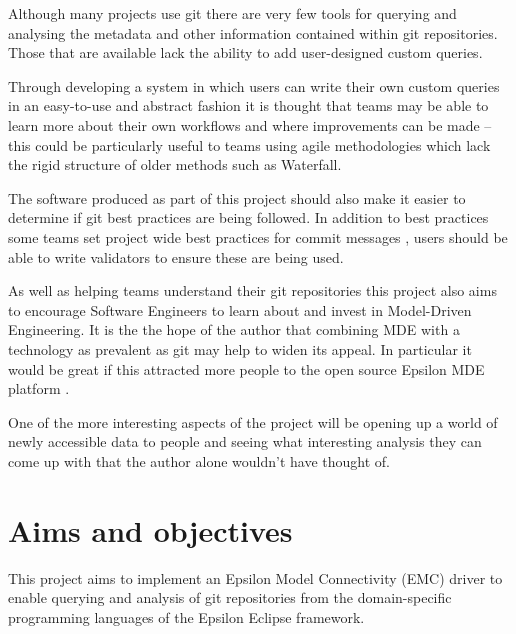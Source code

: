 \documentclass[11pt]{book}
\begin{document}
Although many projects use git there are very few tools for querying and analysing the metadata and other information contained within git repositories. Those that are available lack the ability to add user-designed custom queries. 

Through developing a system in which users can write their own custom queries in an easy-to-use and abstract fashion it is thought that teams may be able to learn more about their own workflows and where improvements can be made -- this could be particularly useful to teams using agile methodologies which lack the rigid structure of older methods such as Waterfall.

The software produced as part of this project should also make it easier to determine if git best practices \cite{gitbestpractices} are being followed. In addition to best practices some teams set project wide best practices for commit messages \cite{erlanggitcommitmessages}, users should be able to write validators to ensure these are being used.

As well as helping teams understand their git repositories this project also aims to encourage Software Engineers to learn about and invest in Model-Driven Engineering. It is the the hope of the author that combining MDE with a technology as prevalent as git may help to widen its appeal. In particular it would be great if this attracted more people to the open source Epsilon MDE platform \cite{epsilonhomepage}.

One of the more interesting aspects of the project will be opening up a world of newly accessible data to people and seeing what interesting analysis they can come up with that the author alone wouldn't have thought of.

\section{Aims and objectives}
\label{aimsandobjectives} 
This project aims to implement an Epsilon Model Connectivity (EMC) driver to enable querying and analysis of git repositories from the domain-specific programming languages of the Epsilon Eclipse framework.
\end{document}

